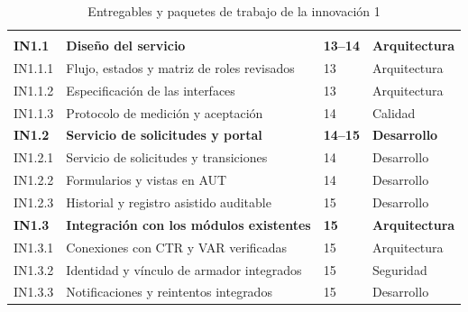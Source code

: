 \begin{longtable}{
  L{\tabcolsep\relax}
  L{\tabcolsep\relax}
  L{\tabcolsep\relax}
  L{\tabcolsep\relax}
}
  \caption{Entregables y paquetes de trabajo de la innovación 1}
  \label{tab:edt-innovacion-1}\\
  \hline
   &
   &
   &
   \\
  \hline
  \endfirsthead

  \hline
   &
   &
   &
   \\
  \hline
  \endhead

  \textbf{IN1.1} & \textbf{Diseño del servicio} &
\textbf{13--14} & \textbf{Arquitectura} \\
  \hline
  IN1.1.1 & Flujo, estados y matriz de roles revisados &
13 & Arquitectura \\
  \hline
  IN1.1.2 & Especificación de las interfaces &
13 & Arquitectura \\
  \hline
  IN1.1.3 & Protocolo de medición y aceptación &
14 & Calidad \\
  \hline

  \textbf{IN1.2} & \textbf{Servicio de solicitudes y portal} &
\textbf{14--15} & \textbf{Desarrollo} \\
  \hline
  IN1.2.1 & Servicio de solicitudes y transiciones &
14 & Desarrollo \\
  \hline
  IN1.2.2 & Formularios y vistas en AUT &
14 & Desarrollo \\
  \hline
  IN1.2.3 & Historial y registro asistido auditable &
15 & Desarrollo \\
  \hline

  \textbf{IN1.3} & \textbf{Integración con los módulos existentes} &
\textbf{15} & \textbf{Arquitectura} \\
  \hline
  IN1.3.1 & Conexiones con CTR y VAR verificadas &
15 & Arquitectura \\
  \hline
  IN1.3.2 & Identidad y vínculo de armador integrados &
15 & Seguridad \\
  \hline
  IN1.3.3 & Notificaciones y reintentos integrados &
15 & Desarrollo \\
  \hline


\end{longtable}
